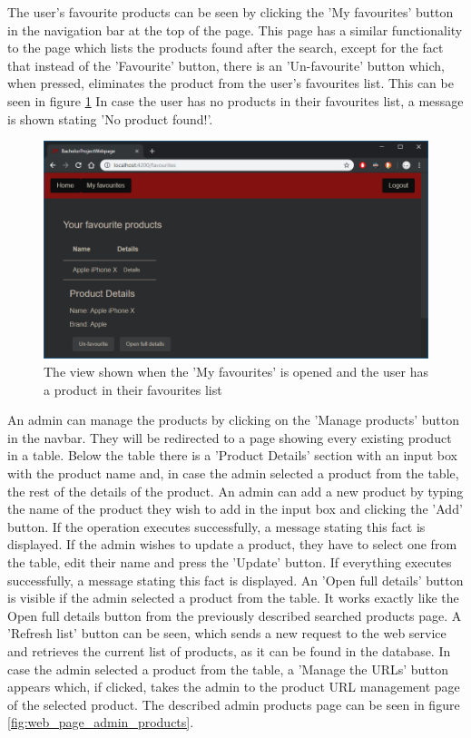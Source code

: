 \documentclass[12pt,a4paper,twoside]{report}
\begin{document}
The user's favourite products can be seen by clicking the 'My favourites' button in the navigation bar at the top of the page. This page has a similar functionality to the page which lists the products found after the search, except for the fact that instead of the 'Favourite' button, there is an 'Un-favourite' button which, when pressed, eliminates the product from the user's favourites list. This can be seen in figure \ref{fig:web_page_favourites} In case the user has no products in their favourites list, a message is shown stating 'No product found!'.

\begin{figure}[ht]
  \centering
  \includegraphics[width=0.75\linewidth]{img/web_page_favourites.png}
  \caption[]{The view shown when the 'My favourites' is opened and the user has a product in their favourites list}
  \label{fig:web_page_favourites}
\end{figure}

An admin can manage the products by clicking on the 'Manage products' button in the navbar. They will be redirected to a page showing every existing product in a table. Below the table there is a 'Product Details' section with an input box with the product name and, in case the admin selected a product from the table, the rest of the details of the product. An admin can add a new product by typing the name of the product they wish to add in the input box and clicking the 'Add' button. If the operation executes successfully, a message stating this fact is displayed. If the admin wishes to update a product, they have to select one from the table, edit their name and press the 'Update' button. If everything executes successfully, a message stating this fact is displayed. An 'Open full details' button is visible if the admin selected a product from the table. It works exactly like the Open full details button from the previously described searched products page. A 'Refresh list' button can be seen, which sends a new request to the web service and retrieves the current list of products, as it can be found in the database. In case the admin selected a product from the table, a 'Manage the URLs' button appears which, if clicked, takes the admin to the product URL management page of the selected product. The described admin products page can be seen in figure \ref{fig:web_page_admin_products}.
\end{document}
